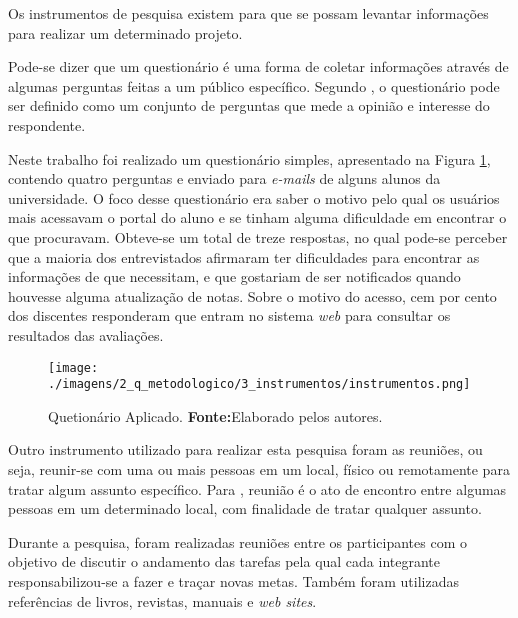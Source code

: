 
	\par Os instrumentos de pesquisa existem para que se possam levantar
informações para realizar um determinado projeto.

	\par Pode-se dizer que um questionário é uma forma de coletar
informações através de algumas perguntas feitas a um público específico.
Segundo , o questionário pode ser definido como
um conjunto de perguntas que mede a opinião e interesse do respondente.

	\par Neste trabalho foi realizado um questionário simples, apresentado na
Figura \ref{fig:qm1}, contendo quatro perguntas e enviado para \textit{e-mails}
de alguns alunos da universidade. O foco desse questionário era saber o motivo
pelo qual os usuários mais acessavam o portal do aluno e se tinham alguma
dificuldade em encontrar o que procuravam. Obteve-se um total de treze
respostas, no qual pode-se perceber que a maioria dos entrevistados afirmaram
ter dificuldades para encontrar as informações de que necessitam, e que
gostariam de ser notificados quando houvesse alguma atualização de notas. Sobre
o motivo do acesso, cem por cento dos discentes responderam que entram no
sistema \textit{web} para consultar os resultados das avaliações.

	\begin{figure}[h!]
		\centerline{\texttt{[image: ./imagens/2\_q\_metodologico/3\_instrumentos/instrumentos.png]}}
		\caption[Quetionário Aplicado]{Quetionário Aplicado.
			\textbf{Fonte:}Elaborado pelos autores.}
		\label{fig:qm1}
	\end{figure}
	
	
	

	\par Outro instrumento utilizado para realizar esta pesquisa foram as reuniões,
ou seja, reunir-se com uma ou mais pessoas em um local, físico ou remotamente
para tratar algum assunto específico. Para , reunião é o ato de
encontro entre algumas pessoas em um determinado local, com finalidade de tratar
qualquer assunto.

	\par Durante a pesquisa, foram realizadas reuniões entre os participantes com
o objetivo de discutir o andamento das tarefas pela qual cada integrante responsabilizou-se
a fazer e traçar novas metas. Também foram utilizadas referências
de livros, revistas, manuais e \textit{web sites}.

\pagebreak